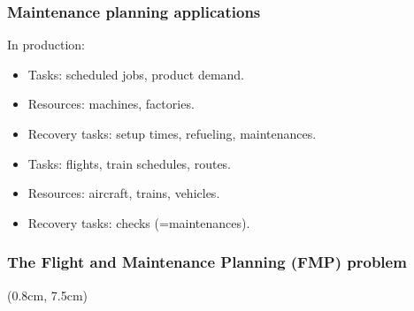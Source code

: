 \begin{frame}
\frametitle{\textbf{Maintenance planning applications}}

  In production:
  \begin{itemize}[<+->]
    \item Tasks: scheduled jobs, product demand.
    \item Resources: machines, factories.
    \item Recovery tasks: setup times, refueling, maintenances.
  \end{itemize}  
  \pause
  \begin{itemize}[<+->]
    \item Tasks: flights, train schedules, routes.
    \item Resources: aircraft, trains, vehicles.
    \item Recovery tasks: checks (=maintenances).
  \end{itemize}

\end{frame}

\begin{frame}[t]
\frametitle{\textbf{The Flight and Maintenance Planning (FMP) problem}}
  
  \begin{adjustbox}{max totalsize={\textwidth}{.5\textheight},center}
  \begin{tikzpicture}
     
  \end{tikzpicture}
  \end{adjustbox}

  \begin{textblock*}{1.1\textwidth}(0.8cm, 7.5cm)
    \begin{flushleft}
    \end{flushleft}
  \end{textblock*}
\end{frame}

